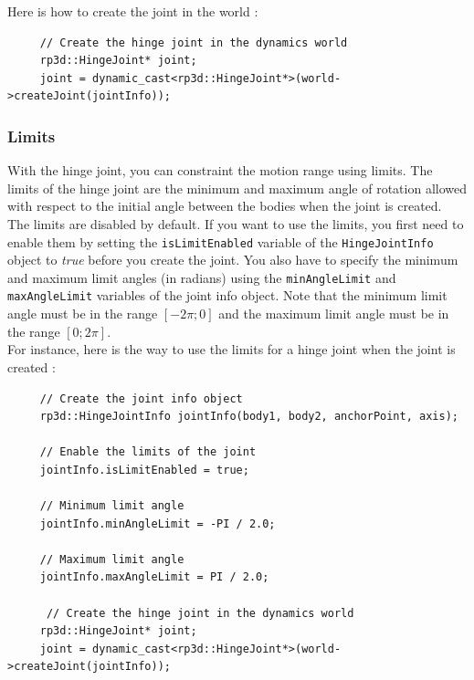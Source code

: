 \documentclass[a4paper,12pt]{article}
\begin{document}
    Here is how to create the joint in the world : \\

    \begin{lstlisting}
     // Create the hinge joint in the dynamics world
     rp3d::HingeJoint* joint;
     joint = dynamic_cast<rp3d::HingeJoint*>(world->createJoint(jointInfo));
  \end{lstlisting}

     \vspace{0.6cm}

     \subsubsection{Limits}

     With the hinge joint, you can constraint the motion range using limits. The limits of the hinge joint are the minimum and maximum angle of rotation allowed with respect to the initial
     angle between the bodies when the joint is created. The limits are disabled by default. If you want to use the limits, you first need to enable them by setting the
     \texttt{isLimitEnabled} variable of the \texttt{HingeJointInfo} object to \emph{true} before you create the joint. You also have to specify the minimum and maximum limit
     angles (in radians) using the \texttt{minAngleLimit} and \texttt{maxAngleLimit} variables of the joint info object. Note that the minimum limit angle must be in the
     range $[ -2 \pi; 0 ]$ and the maximum limit angle must be in the range $[ 0; 2 \pi ]$. \\

     For instance, here is the way to use the limits for a hinge joint when the joint is created : \\

     \begin{lstlisting}
     // Create the joint info object
     rp3d::HingeJointInfo jointInfo(body1, body2, anchorPoint, axis);

     // Enable the limits of the joint
     jointInfo.isLimitEnabled = true;

     // Minimum limit angle
     jointInfo.minAngleLimit = -PI / 2.0;

     // Maximum limit angle
     jointInfo.maxAngleLimit = PI / 2.0;

      // Create the hinge joint in the dynamics world
     rp3d::HingeJoint* joint;
     joint = dynamic_cast<rp3d::HingeJoint*>(world->createJoint(jointInfo));
  \end{lstlisting}
\end{document}
